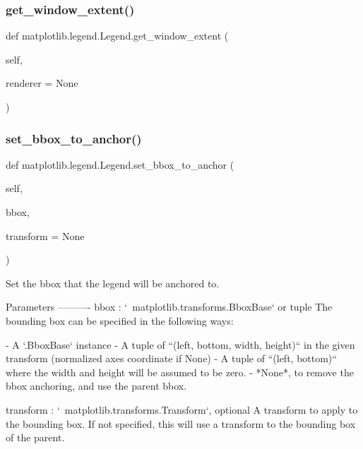 \subsubsection{\texorpdfstring{get\+\_\+window\+\_\+extent()}{get\_window\_extent()}}
{\footnotesize\ttfamily def matplotlib.\+legend.\+Legend.\+get\+\_\+window\+\_\+extent (\begin{DoxyParamCaption}\item[{}]{self,  }\item[{}]{renderer = {\ttfamily None} }\end{DoxyParamCaption})}

\mbox{\label{classmatplotlib_1_1legend_1_1Legend_af439f85df59517a87470d7adce0b1b6d}} 
\subsubsection{\texorpdfstring{set\+\_\+bbox\+\_\+to\+\_\+anchor()}{set\_bbox\_to\_anchor()}}
{\footnotesize\ttfamily def matplotlib.\+legend.\+Legend.\+set\+\_\+bbox\+\_\+to\+\_\+anchor (\begin{DoxyParamCaption}\item[{}]{self,  }\item[{}]{bbox,  }\item[{}]{transform = {\ttfamily None} }\end{DoxyParamCaption})}

\begin{DoxyVerb}Set the bbox that the legend will be anchored to.

Parameters
----------
bbox : `~matplotlib.transforms.BboxBase` or tuple
    The bounding box can be specified in the following ways:

    - A `.BboxBase` instance
    - A tuple of ``(left, bottom, width, height)`` in the given
      transform (normalized axes coordinate if None)
    - A tuple of ``(left, bottom)`` where the width and height will be
      assumed to be zero.
    - *None*, to remove the bbox anchoring, and use the parent bbox.

transform : `~matplotlib.transforms.Transform`, optional
    A transform to apply to the bounding box. If not specified, this
    will use a transform to the bounding box of the parent.
\end{DoxyVerb}
 \mbox{\label{classmatplotlib_1_1legend_1_1Legend_ac00b73cf352be20f5be2afbce92645c2}} 
